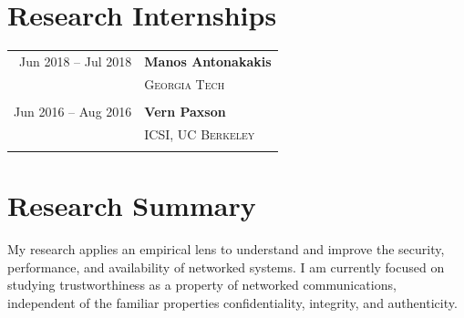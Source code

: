 \documentclass[10pt]{article} %
\begin{document}
{\begin{minipage}[t]{0.44\textwidth}
\section{Research Internships} 

\begin{tabular}{rl}
Jun 2018 -- Jul 2018 & \textbf{Manos Antonakakis}\\
& \textsc{Georgia Tech}\\
&\\

Jun 2016 -- Aug 2016 & \textbf{Vern Paxson}\\
& \textsc{ICSI, UC Berkeley}\\
& \\

\end{tabular}


%
%	
\end{minipage} %
\hfill
\begin{minipage}[t]{0.5\textwidth} %
\vspace{0pt} %
	

\section{Research Summary} 

My research applies an empirical lens to understand and improve the security,
performance, and availability of networked systems. I am currently focused on
studying trustworthiness as a property of networked communications, independent
of the familiar properties confidentiality, integrity, and authenticity. \\


\end{minipage}}
\end{document}
